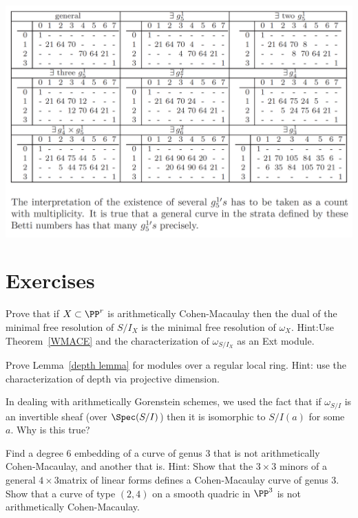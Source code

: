 
\includegraphics[scale = .35]{"genus 9 Sagraloff"}
%

\section{Exercises}

\begin{exercise}
Prove that if $X\subset \PP^r$ is arithmetically Cohen-Macaulay then the dual of the minimal free resolution of $S/I_X$
is the minimal free resolution of $\omega_X$. Hint:Use Theorem~\ref{WMACE} and the characterization of $\omega_{S/I_X}$
as an Ext module.
\end{exercise}

\begin{exercise}
 Prove Lemma~\ref{depth lemma} for modules over a regular local ring.  Hint: use the characterization of depth
 via projective dimension.
\end{exercise}

\begin{exercise}
In dealing with arithmetically Gorenstein schemes, we used the fact that if $\omega_{S/I}$ is an invertible
sheaf (over $\Spec(S/I)$) then it is isomorphic to $S/I(a)$ for some $a$. Why is this true?
\end{exercise}

\begin{exercise}
Find a degree 6 embedding of a curve of genus 3 that is not arithmetically Cohen-Macaulay, and another that is.
Hint: Show that the $3\times 3$ minors of a general $4\times 3$matrix of linear forms defines a Cohen-Macaulay curve
of genus 3. Show that a curve of type $(2,4)$ on a smooth quadric in $\PP^3$ is not arithmetically Cohen-Macaulay.
\end{exercise}

